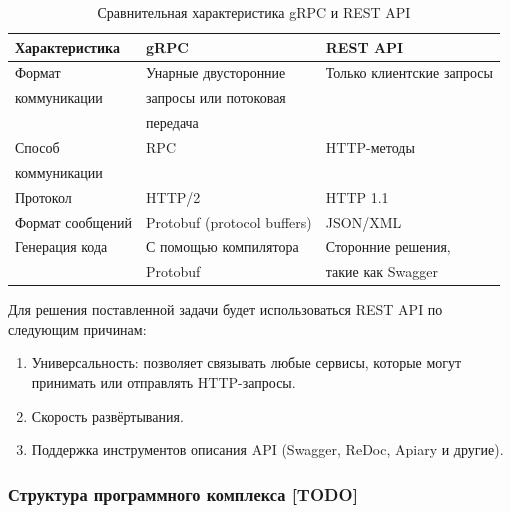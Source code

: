 \clearpage
\begin{table}[h]
	\begin{center}
		\captionsetup{justification=RaggedRight, singlelinecheck=off}
		\caption{Сравнительная характеристика gRPC и REST API}
		\label{tbl:compare}
		\begin{tabular}{|l|l|l|}
			\hline
			Характеристика & gRPC & REST API \\
			\hline
			Формат & Унарные двусторонние & Только клиентские запросы \\
			коммуникации & запросы или потоковая & \\
			 & передача & \\
			\hline
			Способ & RPC & HTTP-методы \\
			коммуникации & & \\
			\hline
			Протокол & HTTP/2 & HTTP 1.1 \\
			\hline
			Формат сообщений & Protobuf (protocol buffers) & JSON/XML \\
			\hline
			Генерация кода & С помощью компилятора & Сторонние решения, \\
			& Protobuf & такие как Swagger \\
			\hline
		\end{tabular}
	\end{center}
\end{table}

Для решения поставленной задачи будет использоваться REST API по следующим причинам:

\begin{enumerate}[label*=\arabic*.]
	\item Универсальность: позволяет связывать любые сервисы, которые могут принимать или отправлять HTTP-запросы.
	\item Скорость развёртывания.
	\item Поддержка инструментов описания API (Swagger, ReDoc, Apiary и другие).
	
\end{enumerate}




\subsubsection{Структура программного комплекса [TODO]}

